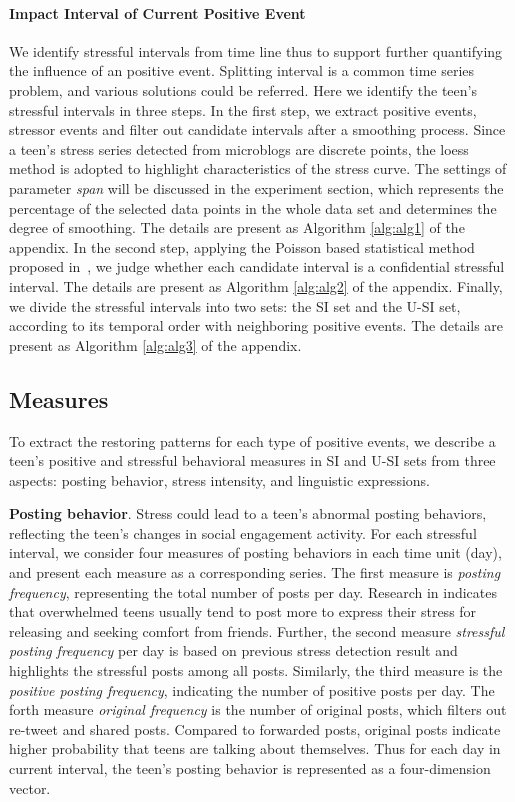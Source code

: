 \paragraph{Impact Interval of Current Positive Event}
We identify stressful intervals from time line thus to support further quantifying the influence of an positive event.
Splitting interval is a common time series problem, and various solutions could be referred.
Here we identify the teen's stressful intervals in three steps.
In the first step, we extract positive events, stressor events and filter out candidate intervals after a smoothing process.
Since a teen's stress series detected from microblogs are discrete points,
the loess method \cite{Cleveland1988Locally} is adopted to highlight characteristics of the stress curve.
The settings of parameter \emph{span} will be discussed in the experiment section,
which represents the percentage of the selected data points in the whole data set
and determines the degree of smoothing.
The details are present as Algorithm \ref{alg:alg1} of the appendix.
In the second step, applying the Poisson based statistical method proposed in~\cite{Li2017Analyzing},
we judge whether each candidate interval is a confidential stressful interval.
The details are present as Algorithm \ref{alg:alg2} of the appendix.
Finally, we divide the stressful intervals into two sets: the SI set and the U-SI set,
according to its temporal order with neighboring positive events.
The details are present as Algorithm \ref{alg:alg3} of the appendix.

\subsection{Measures}
\label{subsec:pattern}
To extract the restoring patterns  for each type of positive events,
we describe a teen's positive and stressful behavioral measures in SI and U-SI sets from three aspects:
posting behavior, stress intensity, and linguistic expressions.

\textbf{Posting behavior}.
Stress could lead to a teen's abnormal posting behaviors,
reflecting the teen's changes in social engagement activity.
For each stressful interval,
we consider four measures of posting behaviors in each time unit (day),
and present each measure as a corresponding series.
The first measure is \emph{posting frequency},
representing the total number of posts per day.
Research in \cite{Li2017Analyzing} indicates that overwhelmed teens usually tend to post more to express their stress for releasing
and seeking comfort from friends.
Further, the second measure \emph{stressful posting frequency} per day
is based on previous stress detection result and highlights the stressful posts among all posts.
Similarly, the third measure is the \emph{positive posting frequency}, indicating the number of positive posts per day.
The forth measure \emph{original frequency} is the number of original posts, which filters out re-tweet and shared posts.
Compared to forwarded posts, original posts indicate higher probability that teens are talking about themselves.
Thus for each day in current interval, the teen's posting behavior is represented as a four-dimension vector.

